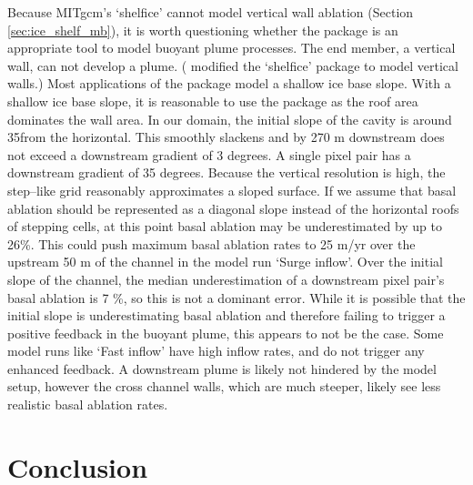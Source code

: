 Because MITgcm's `shelfice' cannot model vertical wall ablation (Section \ref{sec:ice_shelf_mb}), it is worth questioning whether the package is an appropriate tool to model buoyant plume processes. The end member, a vertical wall, can not develop a plume. (\cite{xu2012numerical} modified the `shelfice' package to model vertical walls.) Most applications of the package \citep[e.g.][]{goldberg2019accurately,schodlok2012sensitivity} model a shallow ice base slope. With a shallow ice base slope, it is reasonable to use the package as the roof area dominates the wall area. In our domain, the initial slope of the cavity is around 35\textdegree from the horizontal. This smoothly slackens and by 270 m downstream  does not exceed a downstream gradient of 3 degrees. A single pixel pair has a downstream gradient of 35 degrees. Because the vertical resolution is high, the step--like grid reasonably approximates a sloped surface. If we assume that  basal ablation should be represented as a diagonal slope instead of the horizontal roofs of stepping cells, at this point basal ablation may be underestimated by up to 26\%. This could push maximum basal ablation rates to 25 m/yr over the upstream 50 m of the channel in the model run `Surge inflow'. Over the initial slope of the channel, the median underestimation of a downstream pixel pair's basal ablation is 7 \%, so this is not a dominant error. While it is possible that the initial slope is underestimating basal ablation and therefore failing to trigger a positive feedback in the buoyant plume, this appears to not be the case. Some model runs like `Fast inflow' have high inflow rates, and do not trigger any enhanced feedback. A downstream plume is likely not hindered by the model setup, however the cross channel walls, which are much steeper, likely see less realistic basal ablation rates. 


\section{Conclusion}

